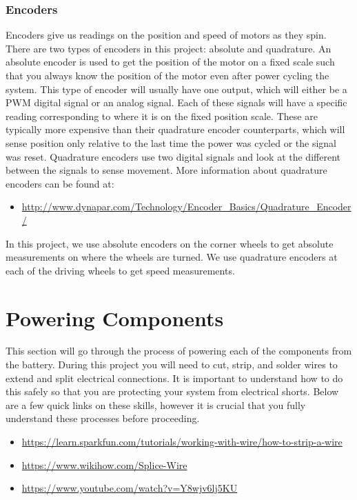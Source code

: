 \documentclass[12pt]{article}
\begin{document}
\subsubsection{Encoders}
Encoders give us readings on the position and speed of motors as they spin. There are two types of encoders in this project: absolute and quadrature. An absolute encoder is used to get the position of the motor on a fixed scale such that you always know the position of the motor even after power cycling the system. This type of encoder will usually have one output, which will either be a PWM digital signal or an analog signal. Each of these signals will have a specific reading corresponding to where it is on the fixed position scale. These are typically more expensive than their quadrature encoder counterparts, which will sense position only relative to the last time the power was cycled or the signal was reset. Quadrature encoders use two digital signals and look at the different between the signals to sense movement. More information about quadrature encoders can be found at: 

\begin{itemize}
	\item \href{http://www.dynapar.com/Technology/Encoder_Basics/Quadrature_Encoder/}{http://www.dynapar.com/Technology/Encoder\_Basics/Quadrature\_Encoder/}  
\end{itemize}

\noindent In this project, we use absolute encoders on the corner wheels to get absolute measurements on where the wheels are turned. We use quadrature encoders at each of the driving wheels to get speed measurements.



\section{Powering Components}
This section will go through the process of powering each of the components from the battery. During this project you will need to cut, strip, and solder wires to extend and split electrical connections. It is important to understand how to do this safely so that you are protecting your system from electrical shorts. Below are a few quick links on these skills, however it is crucial that you fully understand these processes before proceeding. 

\begin{itemize}
	\item \href{https://learn.sparkfun.com/tutorials/working-with-wire/how-to-strip-a-wire}{https://learn.sparkfun.com/tutorials/working-with-wire/how-to-strip-a-wire}
	\item \href{https://www.wikihow.com/Splice-Wire}{https://www.wikihow.com/Splice-Wire}
	\item \href{https://www.youtube.com/watch?v=Y8wjv6lj5KU}{https://www.youtube.com/watch?v=Y8wjv6lj5KU}
\end{itemize}
\end{document}
